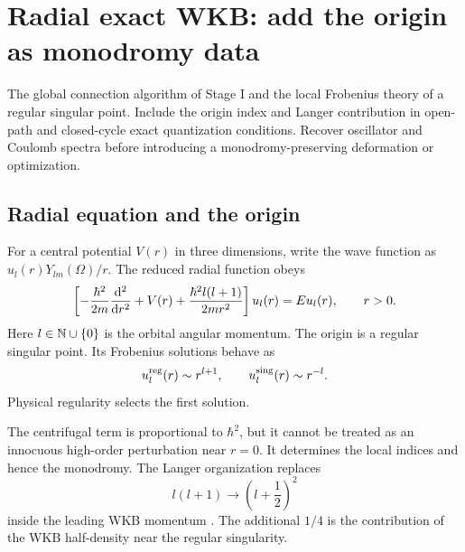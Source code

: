 \section{Radial exact WKB: add the origin as monodromy data}
\label{sec:radial-wkb}

\calculationroute
  {The global connection algorithm of Stage I and the local Frobenius theory
  of a regular singular point.}
  {Include the origin index and Langer contribution in open-path and
  closed-cycle exact quantization conditions.}
  {Recover oscillator and Coulomb spectra before introducing a
  monodromy-preserving deformation or optimization.}

\subsection{Radial equation and the origin}
\label{subsec:radial-equation}

For a central potential $V(r)$ in three dimensions, write the wave function as
$u_l(r)Y_{lm}(\Omega)/r$.  The reduced radial function obeys
\begin{equation}
  \left[
  -\frac{\hbar^2}{2m}\frac{\mathrm{d}^2}{\mathrm{d} r^2}
  +V(r)
  +\frac{\hbar^2l(l+1)}{2mr^2}
  \right]u_l(r)
  =Eu_l(r),
  \qquad r>0 .
  \label{eq:radial-schrodinger}
\end{equation}
Here $l\in\mathbb{N}\cup\{0\}$ is the orbital angular momentum.  The
origin is a regular singular point.  Its Frobenius solutions behave as
\begin{equation}
  u_l^{\mathrm{reg}}(r)\sim r^{l+1},
  \qquad
  u_l^{\mathrm{sing}}(r)\sim r^{-l} .
  \label{eq:radial-frobenius}
\end{equation}
Physical regularity selects the first solution.

The centrifugal term is proportional to $\hbar^2$, but it cannot be treated
as an innocuous high-order perturbation near $r=0$.  It determines the local
indices and hence the monodromy.  The Langer organization replaces
\begin{equation}
  l(l+1)\longrightarrow\left(l+\frac{1}{2}\right)^2
  \label{eq:langer-replacement}
\end{equation}
inside the leading WKB momentum
\cite{Langer:PhysRev.51.669}.  The additional $1/4$ is the contribution of the
WKB half-density near the regular singularity.

